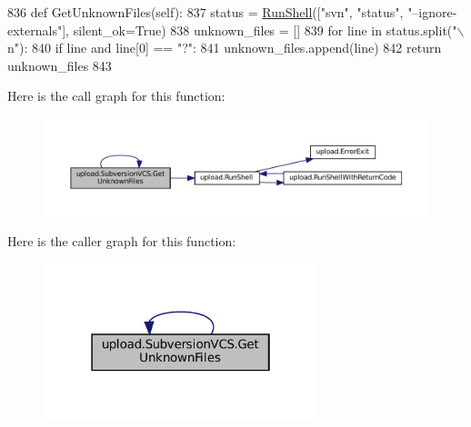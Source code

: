 \begin{DoxyCode}
836   \textcolor{keyword}{def }GetUnknownFiles(self):
837     status = \hyperlink{namespaceupload_adddc423c49132e8879cbb25d6be2cf11}{RunShell}([\textcolor{stringliteral}{"svn"}, \textcolor{stringliteral}{"status"}, \textcolor{stringliteral}{"--ignore-externals"}], silent\_ok=\textcolor{keyword}{True})
838     unknown\_files = []
839     \textcolor{keywordflow}{for} line \textcolor{keywordflow}{in} status.split(\textcolor{stringliteral}{"\(\backslash\)n"}):
840       \textcolor{keywordflow}{if} line \textcolor{keywordflow}{and} line[0] == \textcolor{stringliteral}{"?"}:
841         unknown\_files.append(line)
842     \textcolor{keywordflow}{return} unknown\_files
843 
\end{DoxyCode}
Here is the call graph for this function\+:
\nopagebreak
\begin{figure}[H]
\begin{center}
\leavevmode
\includegraphics[width=350pt]{classupload_1_1SubversionVCS_a494ba1010992d83cac015bc396ab693a_cgraph}
\end{center}
\end{figure}
Here is the caller graph for this function\+:
\nopagebreak
\begin{figure}[H]
\begin{center}
\leavevmode
\includegraphics[width=226pt]{classupload_1_1SubversionVCS_a494ba1010992d83cac015bc396ab693a_icgraph}
\end{center}
\end{figure}
\mbox{\label{classupload_1_1SubversionVCS_a494ba1010992d83cac015bc396ab693a}} 
